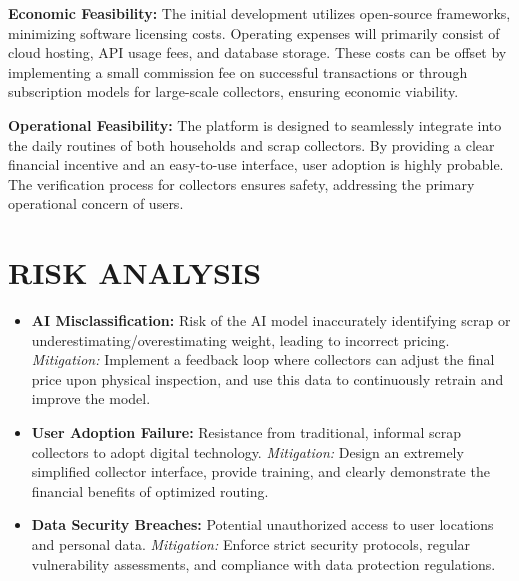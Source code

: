 \textbf{Economic Feasibility:} The initial development utilizes open-source frameworks, minimizing software licensing costs. Operating expenses will primarily consist of cloud hosting, API usage fees, and database storage. These costs can be offset by implementing a small commission fee on successful transactions or through subscription models for large-scale collectors, ensuring economic viability.

\textbf{Operational Feasibility:} The platform is designed to seamlessly integrate into the daily routines of both households and scrap collectors. By providing a clear financial incentive and an easy-to-use interface, user adoption is highly probable. The verification process for collectors ensures safety, addressing the primary operational concern of users.

\section{RISK ANALYSIS}
\begin{itemize}
    \item \textbf{AI Misclassification:} Risk of the AI model inaccurately identifying scrap or underestimating/overestimating weight, leading to incorrect pricing. \textit{Mitigation:} Implement a feedback loop where collectors can adjust the final price upon physical inspection, and use this data to continuously retrain and improve the model.
    \item \textbf{User Adoption Failure:} Resistance from traditional, informal scrap collectors to adopt digital technology. \textit{Mitigation:} Design an extremely simplified collector interface, provide training, and clearly demonstrate the financial benefits of optimized routing.
    \item \textbf{Data Security Breaches:} Potential unauthorized access to user locations and personal data. \textit{Mitigation:} Enforce strict security protocols, regular vulnerability assessments, and compliance with data protection regulations.
\end{itemize}
